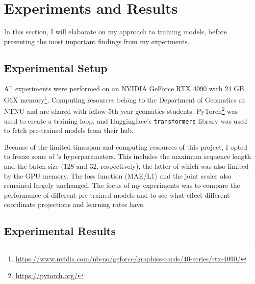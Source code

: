 \section{Experiments and Results}
\label{sec:Experiments}

In this section, I will elaborate on my approach to training models, before presenting the most important findings from my experiments.

\subsection{Experimental Setup}
\label{sec:experimentalSetup}


All experiments were performed on an NVIDIA GeForce RTX 4090 with 24 GB G6X memory\footnote{\url{https://www.nvidia.com/nb-no/geforce/graphics-cards/40-series/rtx-4090/}}. Computing resources belong to the Department of Geomatics at NTNU and are shared with fellow 5th year geomatics students. PyTorch\footnote{\url{https://pytorch.org/}} was used to create a training loop, and Huggingface's \texttt{transformers} library was used to fetch pre-trained models from their hub.

Because of the limited timespan and computing resources of this project, I opted to freeze some of \citeauthor{scherrerHeLjuVarDial20202020}'s hyperparameters. This includes the maximum sequence length and the batch size (128 and 32, respectively), the latter of which was also limited by the GPU memory. The loss function (MAE/L1) and the joint scaler \citep[5]{scherrerHeLjuVarDial20202020} also remained largely unchanged. The focus of my experiments was to compare the performance of different pre-trained models and to see what effect different coordinate projections and learning rates have.

\subsection{Experimental Results}
\label{sec:experimentalResults}

